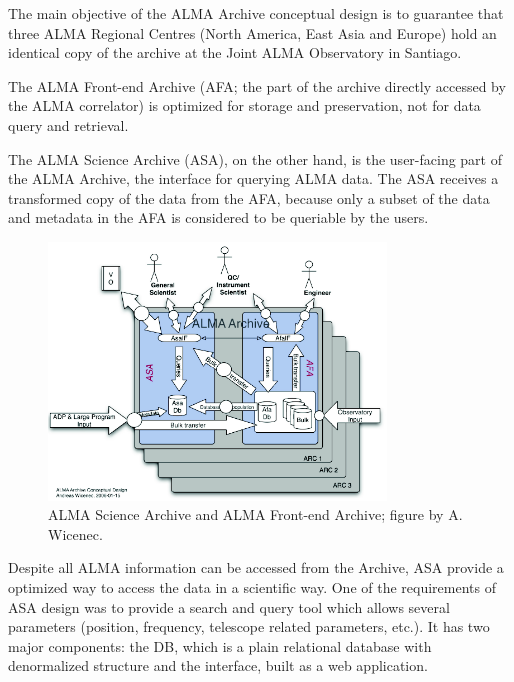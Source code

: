The main objective of the
ALMA Archive
conceptual design
is to guarantee that three ALMA Regional Centres (North America,
East Asia %
and Europe) hold an identical copy of the archive at the Joint ALMA Observatory in Santiago. 

The ALMA Front-end Archive (AFA; the part of the archive directly accessed by the ALMA correlator)
is optimized for storage and preservation, not for data query and retrieval.

The ALMA Science Archive (ASA), on the other hand, is the user-facing part of the ALMA Archive, the interface for querying ALMA data. The ASA receives a transformed copy of the data from the AFA, because only a subset of the data and metadata in the AFA is considered to be queriable by the users.

\begin{figure}
\centering
\includegraphics[width=0.8\textwidth]{images/alma_science_archive.png}
\caption{ALMA Science Archive and ALMA Front-end Archive; figure by A. Wicenec.}
\end{figure}





Despite all ALMA information can be accessed from the Archive, ASA provide a optimized way to access the data in a scientific way. One of the requirements of ASA design was to provide a search and query tool which allows several parameters (position, frequency, telescope related parameters, etc.). It has two major components: the DB, which is a plain relational database with denormalized structure and the interface, built as a web application.

